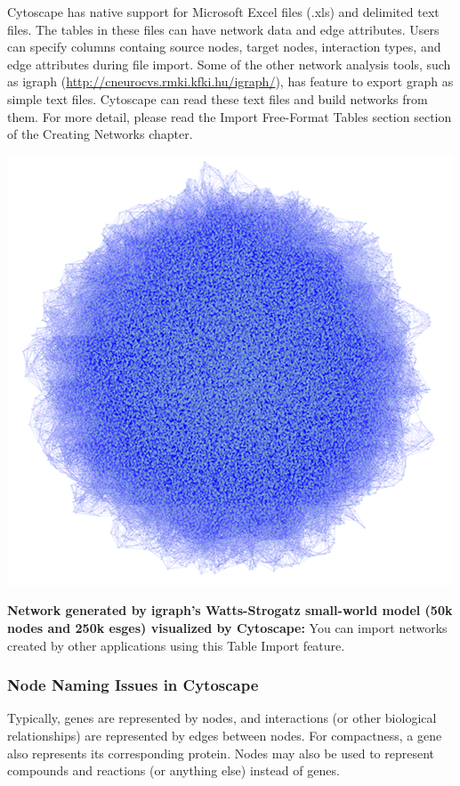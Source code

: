  Cytoscape has native support for Microsoft Excel files (.xls) and delimited text files. The tables in these files can have network data and edge attributes. Users can specify columns containg source nodes, target nodes, interaction types, and edge attributes during file import. Some of the other network analysis tools, such as igraph (\url{http://cneurocvs.rmki.kfki.hu/igraph/}), has feature to export graph as simple text files. Cytoscape can read these text files and build networks from them. For more detail, please read the Import Free-Format Tables section section of the Creating Networks chapter. 

 \includegraphics[width=\textwidth]{images/huge_network_igraph.png} 

 \textbf{Network generated by igraph's Watts-Strogatz small-world model (50k nodes and 250k esges) visualized by Cytoscape:}
 You can import networks created by other applications using this Table Import feature. 
 
\subsubsection{Node Naming Issues in Cytoscape}

 Typically, genes are represented by nodes, and interactions (or other biological relationships) are represented by edges between nodes. For compactness, a gene also represents its corresponding protein. Nodes may also be used to represent compounds and reactions (or anything else) instead of genes. 

